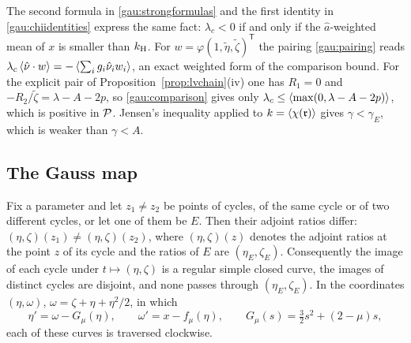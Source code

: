 The second formula in \eqref{gau:strongformulas} and the first identity in \eqref{gau:chiidentities} express the same fact: $\lambda_c<0$ if and only if the $\hat a$-weighted mean of $x$ is smaller than $k_{\mathrm H}$. For $w=\varphi(1,\tilde\eta,\tilde\zeta)^{\mathsf T}$ the pairing \eqref{gau:pairing} reads $\lambda_c\left\langle \hat\nu\cdot w\right\rangle=-\left\langle \sum_ig_i\hat\nu_iw_i\right\rangle$, an exact weighted form of the comparison bound. For the explicit pair of Proposition~\ref{prop:lvchain}(iv) one has $R_1=0$ and $-R_2/\tilde\zeta=\lambda-A-2p$, so \eqref{gau:comparison} gives only $\lambda_c\le\left\langle \max(0,\lambda-A-2p)\right\rangle$, which is positive in $\mathcal P$. Jensen's inequality applied to $k=\left\langle \chi(\mathfrak r)\right\rangle$ gives $\gamma<\gamma_E$, which is weaker than $\gamma<A$.

\subsection{The Gauss map}
\begin{proposition}\label{prop:gaussmap}
Fix a parameter and let $z_1\ne z_2$ be points of cycles, of the same cycle or of two different cycles, or let one of them be $E$. Then their adjoint ratios differ: $(\eta,\zeta)(z_1)\ne(\eta,\zeta)(z_2)$, where $(\eta,\zeta)(z)$ denotes the adjoint ratios at the point $z$ of its cycle and the ratios of $E$ are $(\eta_E,\zeta_E)$. Consequently the image of each cycle under $t\mapsto(\eta,\zeta)$ is a regular simple closed curve, the images of distinct cycles are disjoint, and none passes through $(\eta_E,\zeta_E)$. In the coordinates $(\eta,\omega)$, $\omega=\zeta+\eta+\eta^2/2$, in which
\begin{equation}\label{gau:lienardplane}
\eta'=\omega-G_\mu(\eta),\qquad \omega'=x-f_\mu(\eta),\qquad G_\mu(s)=\tfrac32s^2+(2-\mu)s,
\end{equation}
each of these curves is traversed clockwise.
\end{proposition}
